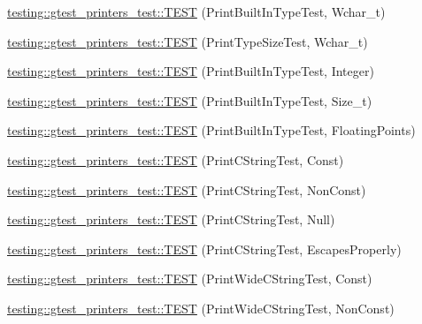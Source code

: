 \begin{DoxyCompactItemize}
\item 
\hyperlink{namespacetesting_1_1gtest__printers__test_ab567ebd97eff0a4b9a20a5f5cb77d678}{testing\-::gtest\-\_\-printers\-\_\-test\-::\-T\-E\-S\-T} (Print\-Built\-In\-Type\-Test, Wchar\-\_\-t)
\item 
\hyperlink{namespacetesting_1_1gtest__printers__test_a705ec4c2886606a22194107397fceea6}{testing\-::gtest\-\_\-printers\-\_\-test\-::\-T\-E\-S\-T} (Print\-Type\-Size\-Test, Wchar\-\_\-t)
\item 
\hyperlink{namespacetesting_1_1gtest__printers__test_a278d53e99390c7b31ff531524fe5e86e}{testing\-::gtest\-\_\-printers\-\_\-test\-::\-T\-E\-S\-T} (Print\-Built\-In\-Type\-Test, Integer)
\item 
\hyperlink{namespacetesting_1_1gtest__printers__test_a991dc124d153742c3ca126b2fa9ccab5}{testing\-::gtest\-\_\-printers\-\_\-test\-::\-T\-E\-S\-T} (Print\-Built\-In\-Type\-Test, Size\-\_\-t)
\item 
\hyperlink{namespacetesting_1_1gtest__printers__test_acde0b28d177604ddb5e185d7b107f6f7}{testing\-::gtest\-\_\-printers\-\_\-test\-::\-T\-E\-S\-T} (Print\-Built\-In\-Type\-Test, Floating\-Points)
\item 
\hyperlink{namespacetesting_1_1gtest__printers__test_a6cd47b21ad8d9ac66ba57b5b6415a924}{testing\-::gtest\-\_\-printers\-\_\-test\-::\-T\-E\-S\-T} (Print\-C\-String\-Test, Const)
\item 
\hyperlink{namespacetesting_1_1gtest__printers__test_a89d9905fecee1b976c26d35498734dd4}{testing\-::gtest\-\_\-printers\-\_\-test\-::\-T\-E\-S\-T} (Print\-C\-String\-Test, Non\-Const)
\item 
\hyperlink{namespacetesting_1_1gtest__printers__test_ad29b97d58a4d1e5e8dd4d854f66b9e22}{testing\-::gtest\-\_\-printers\-\_\-test\-::\-T\-E\-S\-T} (Print\-C\-String\-Test, Null)
\item 
\hyperlink{namespacetesting_1_1gtest__printers__test_a140030b990011abab91d4c0b59f21edd}{testing\-::gtest\-\_\-printers\-\_\-test\-::\-T\-E\-S\-T} (Print\-C\-String\-Test, Escapes\-Properly)
\item 
\hyperlink{namespacetesting_1_1gtest__printers__test_a4caa1f81979cdc6f5ada95e01a4fae63}{testing\-::gtest\-\_\-printers\-\_\-test\-::\-T\-E\-S\-T} (Print\-Wide\-C\-String\-Test, Const)
\item 
\hyperlink{namespacetesting_1_1gtest__printers__test_a8812b5f088e13083ebb8a7e35fbcdae7}{testing\-::gtest\-\_\-printers\-\_\-test\-::\-T\-E\-S\-T} (Print\-Wide\-C\-String\-Test, Non\-Const)
\item 

\end{DoxyCompactItemize}
